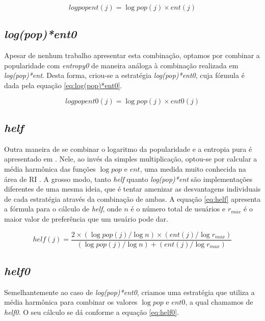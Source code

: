 \begin{equation}
logpopent(j) = \log pop(j) \times ent(j)
\label{eq:log(pop)*ent}
\end{equation}

\subsection{\textit{log(pop)*ent0}}
Apesar de nenhum trabalho apresentar esta combinação, optamos por combinar a popularidade com \textit{entropy0} de maneira análoga à combinação realizada em \textit{log(pop)*ent}. Desta forma, criou-se a estratégia \textit{log(pop)*ent0}, cuja fórmula é dada pela equação \ref{eq:log(pop)*ent0}.

\begin{equation}
logpopent0(j) = \log pop(j) \times ent0(j)
\label{eq:log(pop)*ent0}
\end{equation}

\subsection{\textit{helf}}
Outra maneira de se combinar o logaritmo da popularidade e a entropia pura é apresentado em \citep{Rashid:2008:LPN:1540276.1540302}. Nele, ao invés da simples multiplicação, optou-se por calcular a média harmônica das funções $\log pop$ e $ent$, uma medida muito conhecida na área de RI \citep{Baeza-Yates:1999:MIR:553876}. A grosso modo, tanto \textit{helf} quanto \textit{log(pop)*ent} são implementações diferentes de uma mesma ideia, que é tentar amenizar as desvantagens individuais de cada estratégia através da combinação de ambas. A equação \ref{eq:helf} apresenta a fórmula para o cálculo de \textit{helf}, onde $n$ é o número total de usuários e $r_{max}$ é o maior valor de preferência que um usuário pode dar. 

\begin{equation}
helf(j) = \frac{2 \times (\log pop(j)/\log n) \times (ent(j)/\log r_{max})}{(\log pop(j)/\log n) + (ent(j)/\log r_{max})}
\label{eq:helf}
\end{equation}

\subsection{\textit{helf0}}
Semelhantemente ao caso de \textit{log(pop)*ent0}, criamos uma estratégia que utiliza a média harmônica para combinar os valores $\log pop$ e $ent0$, a qual chamamos de \textit{helf0}. O seu cálculo se dá conforme a equação \ref{eq:helf0}.


